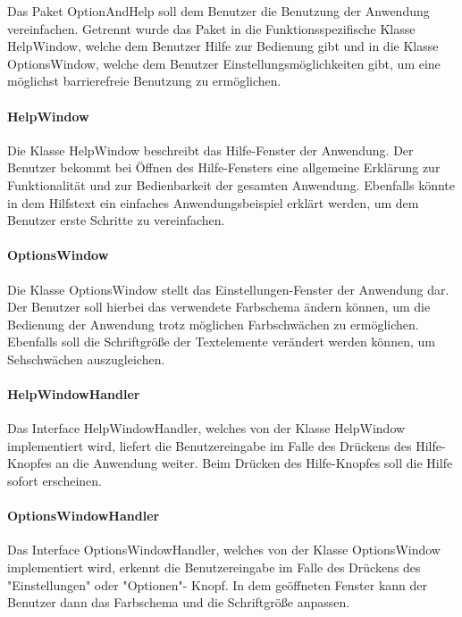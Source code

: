 \documentclass[parskip=full]{scrartcl}
\begin{document}
Das Paket OptionAndHelp soll dem Benutzer die Benutzung der Anwendung vereinfachen. Getrennt wurde das Paket in die Funktionsspezifische Klasse HelpWindow, welche dem Benutzer Hilfe zur Bedienung gibt und in die Klasse OptionsWindow, welche dem Benutzer Einstellungsmöglichkeiten gibt, um eine möglichst barrierefreie Benutzung zu ermöglichen.

\paragraph{HelpWindow}

Die Klasse HelpWindow beschreibt das Hilfe-Fenster der Anwendung. Der Benutzer bekommt bei Öffnen des Hilfe-Fensters eine allgemeine Erklärung zur Funktionalität und zur Bedienbarkeit der gesamten Anwendung. Ebenfalls könnte in dem Hilfstext ein einfaches Anwendungsbeispiel erklärt werden, um dem Benutzer erste Schritte zu vereinfachen.

\paragraph{OptionsWindow}

Die Klasse OptionsWindow stellt das Einstellungen-Fenster der Anwendung dar. Der Benutzer soll hierbei das verwendete Farbschema ändern können, um die Bedienung der Anwendung trotz möglichen Farbschwächen zu ermöglichen. Ebenfalls soll die Schriftgröße der Textelemente verändert werden können, um Sehschwächen auszugleichen. 

\paragraph{HelpWindowHandler}

Das Interface HelpWindowHandler, welches von der Klasse HelpWindow implementiert wird, liefert die Benutzereingabe im Falle des Drückens des Hilfe-Knopfes an die Anwendung weiter. Beim Drücken des Hilfe-Knopfes soll die Hilfe sofort erscheinen.

\paragraph{OptionsWindowHandler}

Das Interface OptionsWindowHandler, welches von der Klasse OptionsWindow implementiert wird, erkennt die Benutzereingabe im Falle des Drückens des "Einstellungen" oder "Optionen"- Knopf. In dem geöffneten Fenster kann der Benutzer dann das Farbschema und die Schriftgröße anpassen.
\end{document}
